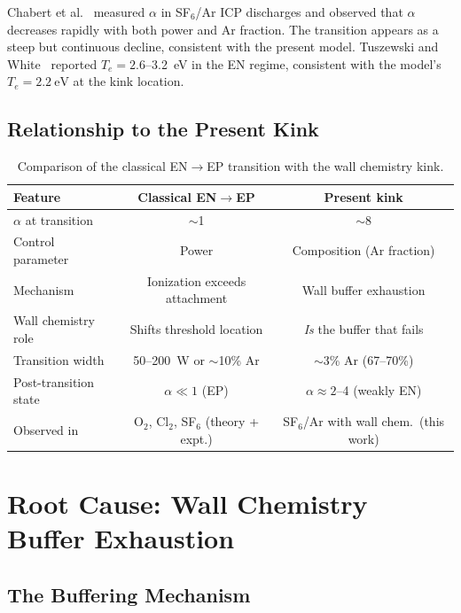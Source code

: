 \documentclass[11pt,a4paper]{report}
\newcommand{\Te}{T_e}
\begin{document}
Chabert et al.~\cite{Chabert1999} measured $\alpha$ in SF$_6$/Ar ICP discharges and observed that $\alpha$ decreases rapidly with both power and Ar fraction.  The transition appears as a steep but continuous decline, consistent with the present model.  Tuszewski and White~\cite{Tuszewski2002} reported $\Te = 2.6$--\SI{3.2}{\electronvolt} in the EN regime, consistent with the model's $\Te = \SI{2.2}{\electronvolt}$ at the kink location.

\subsection{Relationship to the Present Kink}
\label{sec:kink_comparison}

\begin{table}[H]
\centering\small
\caption{Comparison of the classical EN$\to$EP transition with the wall chemistry kink.}
\label{tab:kink_comparison}
\begin{tabular}{lcc}
\toprule
\textbf{Feature} & \textbf{Classical EN$\to$EP} & \textbf{Present kink} \\
\midrule
$\alpha$ at transition & $\sim$1 & $\sim$8 \\
Control parameter & Power & Composition (Ar fraction) \\
Mechanism & Ionization exceeds attachment & Wall buffer exhaustion \\
Wall chemistry role & Shifts threshold location & \textit{Is} the buffer that fails \\
Transition width & 50--\SI{200}{\watt} or $\sim$10\% Ar & $\sim$3\% Ar (67--70\%) \\
Post-transition state & $\alpha \ll 1$ (EP) & $\alpha \approx 2$--4 (weakly EN) \\
Observed in & O$_2$, Cl$_2$, SF$_6$ (theory + expt.) & SF$_6$/Ar with wall chem.\ (this work) \\
\bottomrule
\end{tabular}
\end{table}

\section{Root Cause: Wall Chemistry Buffer Exhaustion}
\label{sec:kink_rootcause}

\subsection{The Buffering Mechanism}
\label{sec:kink_buffer}
\end{document}
